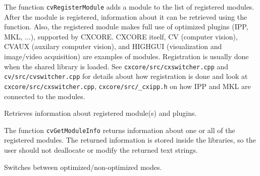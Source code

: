 The function \texttt{cvRegisterModule} adds a module to the list of
registered modules. After the module is registered, information about
it can be retrieved using the  function. Also, the
registered module makes full use of optimized plugins (IPP, MKL, ...),
supported by CXCORE. CXCORE itself, CV (computer vision), CVAUX (auxilary
computer vision), and HIGHGUI (visualization and image/video acquisition) are
examples of modules. Registration is usually done when the shared library
is loaded. See \texttt{cxcore/src/cxswitcher.cpp} and
\texttt{cv/src/cvswitcher.cpp} for details about how registration is done
and look at \texttt{cxcore/src/cxswitcher.cpp}, \texttt{cxcore/src/\_cxipp.h}
on how IPP and MKL are connected to the modules.

\label{GetModuleInfo}

Retrieves information about registered module(s) and plugins.


\begin{description}
\end{description}

The function \texttt{cvGetModuleInfo} returns information about one or
all of the registered modules. The returned information is stored inside
the libraries, so the user should not deallocate or modify the returned
text strings.

\label{UseOptimized}

Switches between optimized/non-optimized modes.


\begin{description}
\end{description}

